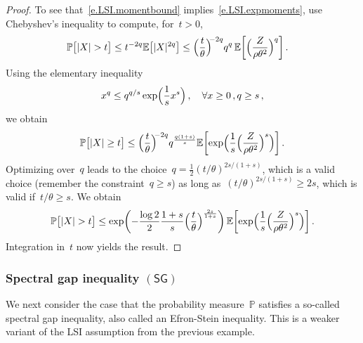 \documentclass[11pt]{article} %
\numberwithin{equation}{section}
\theoremstyle{definition}
\let\originalleft\left
\let\originalright\right
\renewcommand{\left}{\mathopen{}\mathclose\bgroup\originalleft}
\renewcommand{\right}{\aftergroup\egroup\originalright}
\renewcommand{\P}{\mathbb{P}}
\newcommand{\E}{\mathbb{E}}
\begin{document}
\begin{proof}
To see that~\eqref{e.LSI.momentbound} implies~\eqref{e.LSI.expmoments}, use Chebyshev's inequality to compute, for~$t>0$, 
\begin{align*}
\P \bigl[ |X| > t \bigr]
\leq
t^{-2q} \E \bigl[ |X|^{2q} \bigr]
&
\leq
\Bigl( \frac{t}{\theta} \Bigr)^{\!\!-2q} 
q^{q} \,
\E \biggl[ \Bigl( \frac{Z}{\rho\theta^2} \Bigr)^{q} \biggr]\,.
\end{align*}
Using the elementary inequality 
\begin{equation*}
x^q \leq q^{q/s} \exp\Bigl( \frac1s x^s \Bigr)\,, \quad \forall x \geq0\,, q \geq s\,,
\end{equation*}
we obtain
\begin{equation*}
\P \bigl[ |X| \geq t \bigr]
\leq
\Bigl( \frac{t}{\theta} \Bigr)^{\!\!-2q} 
q^{\frac{q(1+s)}{s}}
\E \left[ \exp\Bigl( \frac1{s} \Bigl( \frac{Z}{\rho\theta^2}  \Bigr)^{s} \Bigr) \right] 
\,.
\end{equation*}
Optimizing over~$q$ leads to the choice~$q = \frac12 (t / \theta)^{2s/(1+s)}$, which is a valid choice (remember the constraint~$q\geq s$) as long as~$(t / \theta)^{2s/(1+s)} \geq 2s$, which is valid if~$t / \theta \geq s$. We obtain
\begin{equation*}
\P \bigl[ |X| > t \bigr]
\leq
\exp\biggl( 
-\frac{\log 2}{2}
\frac{1+s}{s} \Bigl( \frac{t}{\theta} \Bigr)^{\frac{2s}{1+s}}
\biggr) \,
\E \left[ \exp\Bigl( \frac1{s} \Bigl( \frac{Z}{\rho\theta^2}  \Bigr)^{s} \Bigr) \right]
\,.
\end{equation*}
Integration in~$t$ now yields the result. 
\end{proof}




\subsubsection{Spectral gap inequality $(\mathsf{SG})$}
\label{ss.SG}

We next consider the case that the probability measure~$\P$ satisfies a so-called spectral gap inequality, also called an Efron-Stein inequality. This is a weaker variant of the LSI assumption from the previous example. 

\smallskip
\end{document}
